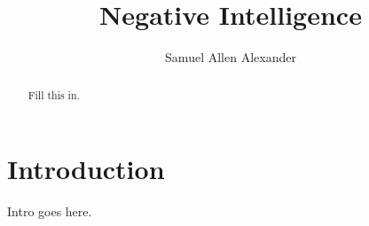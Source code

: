 \documentclass{article}
\title{Negative Intelligence}
\author{Samuel Allen Alexander}
\begin{document}
\maketitle

\begin{abstract}
    Fill this in.
\end{abstract}

\section{Introduction}

Intro goes here.
\end{document}
